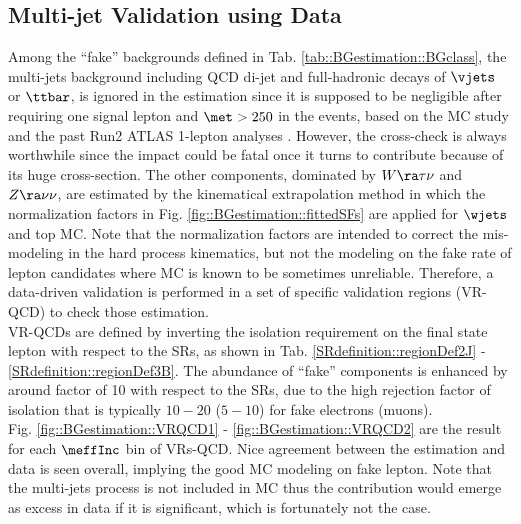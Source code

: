 \subsection{Multi-jet Validation using Data} \label{sec::BGestimation::VRQCD}
Among the ``fake'' backgrounds defined in Tab. \ref{tab::BGestimation::BGclass}, 
the multi-jets background including QCD di-jet and full-hadronic decays of $\vjets$ or $\ttbar$, is ignored in the estimation since it is supposed to be negligible after requiring one signal lepton and $\met>250$ in the events, based on the MC study and the past Run2 ATLAS 1-lepton analyses \cite{strong1L_3p2fb_paper}\cite{strong1L_ICHEP2016_CONF}.
However, the cross-check is always worthwhile since the impact could be fatal once it turns to contribute because of its huge cross-section. 
The other components, dominated by $W\ra\tau\nu$ and $Z\ra\nu\nu$, are estimated by the kinematical extrapolation method in which the normalization factors in Fig. \ref{fig::BGestimation::fittedSFs} are applied for $\wjets$ and top MC. Note that the normalization factors are intended to correct the mis-modeling in the hard process kinematics, but not the modeling on the fake rate of lepton candidates where MC is known to be sometimes unreliable. 
Therefore, a data-driven validation is performed in a set of specific validation regions (VR-QCD) to check those estimation. \\

VR-QCDs are defined by inverting the isolation requirement on the final state lepton with respect to the SRs, as shown in Tab. \ref{SRdefinition::regionDef2J} - \ref{SRdefinition::regionDef3B}. 
The abundance of ``fake'' components is enhanced by around factor of 10 with respect to the SRs, due to the high rejection factor of isolation that is typically $10-20$ ($5-10$) for fake electrons (muons). \\

Fig. \ref{fig::BGestimation::VRQCD1} - \ref{fig::BGestimation::VRQCD2} are the result for each $\meffInc$ bin of VRs-QCD. Nice agreement between the estimation and data is seen overall, implying the good MC modeling on fake lepton. Note that the multi-jets process is not included in MC thus the contribution would emerge as excess in data if it is significant, which is fortunately not the case. \\

